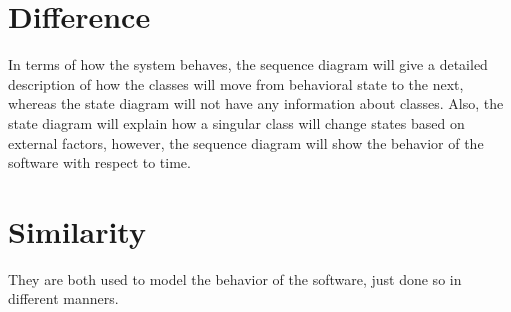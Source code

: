 \newpage
{}
	\part{Difference}
		In terms of how the system behaves, the sequence diagram will give a detailed description of how the classes will move from behavioral state to the next, whereas the state diagram will not have any information about classes. Also, the state diagram will explain how a singular class will change states based on external factors, however, the sequence diagram will show the behavior of the software with respect to time.
	
	\part{Similarity}
		They are both used to model the behavior of the software, just done so in different manners.

